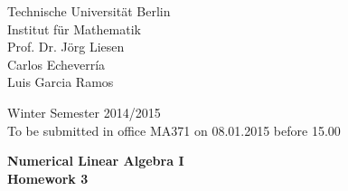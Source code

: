 \documentclass[10pt]{report}
\begin{document}
\begin{minipage}[t]{0.58\textwidth}
Technische Universit\"at Berlin\\
Institut f\"ur Mathematik\\
Prof. Dr. J\"org Liesen\\
Carlos Echeverr\'ia\\
Luis Garcia Ramos
\end{minipage}
\hfill
\begin{minipage}[t]{0.48\textwidth}
\begin{flushright}
Winter Semester 2014/2015\\
To be submitted in office MA371 on 08.01.2015 before 15.00
\end{flushright}
\end{minipage}
\begin{center}
\textbf{{Numerical Linear Algebra I}}\\
\textbf{Homework 3}
\end{center}
\thispagestyle{empty}
\vspace{0cm}
\end{document}
